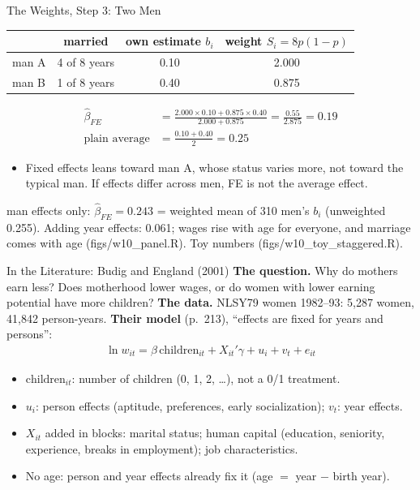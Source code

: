 \documentclass[aspectratio=169,11pt,xcolor=dvipsnames]{beamer}
\newcommand{\srcp}[1]{{\scriptsize\color{gray}(#1)}}
\begin{document}
\begin{frame}{The Weights, Step 3: Two Men}
\begin{center}\small
\renewcommand{\arraystretch}{1.1}
\begin{tabular}{@{}lccc@{}}
\toprule
 & married & own estimate $b_i$ & weight $S_i = 8p(1-p)$ \\
\midrule
man A & 4 of 8 years & 0.10 & 2.000 \\
man B & 1 of 8 years & 0.40 & 0.875 \\
\bottomrule
\end{tabular}
\end{center}
\begin{align*}
  \hat\beta_{FE} &= \frac{2.000 \times 0.10 + 0.875 \times 0.40}{2.000 + 0.875} = \frac{0.55}{2.875} = 0.19 \\
  \text{plain average} &= \frac{0.10 + 0.40}{2} = 0.25
\end{align*}
\begin{itemize}\itemsep3pt
  \item Fixed effects leans toward man A, whose status varies more, not toward the
        typical man. If effects differ across men, FE is not the average effect.
\end{itemize}
\vskip2pt
{\footnotesize man effects only: $\hat\beta_{FE} = 0.243$ = weighted mean of 310 men's $b_i$ (unweighted 0.255).
Adding year effects: 0.061; wages rise with age for everyone, and marriage comes with age \srcp{figs/w10\_panel.R}.}
{\footnotesize Toy numbers \srcp{figs/w10\_toy\_staggered.R}.}
\end{frame}

\begin{frame}{In the Literature: Budig and England (2001)}
\textbf{The question.} Why do mothers earn less? Does motherhood lower wages, or do women
with lower earning potential have more children?
\vskip3pt
\textbf{The data.} NLSY79 women 1982--93: 5,287 women, 41,842 person-years.
\vskip3pt
\textbf{Their model} (p.~213), ``effects are fixed for years and persons'':
\begin{align*}
  \ln w_{it} = \beta\,\text{children}_{it} + X_{it}'\gamma + u_i + v_t + e_{it}
\end{align*}
\vskip-6pt
\begin{itemize}\itemsep2pt
  \item $\text{children}_{it}$: number of children (0, 1, 2, \dots), not a 0/1 treatment.
  \item $u_i$: person effects (aptitude, preferences, early socialization); $v_t$: year effects.
  \item $X_{it}$ added in blocks: marital status; human capital (education, seniority,
        experience, breaks in employment); job characteristics.
  \item No age: person and year effects already fix it (age $=$ year $-$ birth year).
\end{itemize}
\end{frame}
\end{document}
